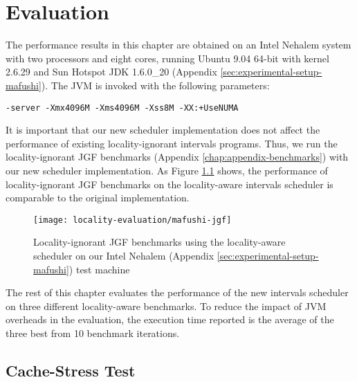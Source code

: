
\chapter{Evaluation}
\label{chap:locality-evaluation}

The performance results in this chapter are obtained on an Intel
Nehalem system with two processors and eight cores, running Ubuntu
9.04 64-bit with kernel 2.6.29 and Sun Hotspot JDK 1.6.0\_20 (Appendix
\ref{sec:experimental-setup-mafushi}). The JVM is invoked with the
following parameters:

\begin{lstlisting}[style=Listing]
  -server -Xmx4096M -Xms4096M -Xss8M -XX:+UseNUMA
\end{lstlisting}

It is important that our new scheduler implementation does not affect
the performance of existing locality-ignorant intervals
programs. Thus, we run the locality-ignorant JGF benchmarks (Appendix
\ref{chap:appendix-benchmarks}) with our new scheduler
implementation. As Figure \ref{fig:locality-evaluation-jgf} shows, the
performance of locality-ignorant JGF benchmarks on the locality-aware
intervals scheduler is comparable to the original implementation.

\begin{figure}[!ht]
  \centering
  \texttt{[image: locality-evaluation/mafushi-jgf]}
  \caption[Locality-ignorant JGF benchmarks running on locality-aware
  scheduler]{Locality-ignorant JGF benchmarks using the locality-aware
    scheduler on our Intel Nehalem (Appendix
    \ref{sec:experimental-setup-mafushi}) test machine}
  \label{fig:locality-evaluation-jgf}
\end{figure}

The rest of this chapter evaluates the performance of the new
intervals scheduler on three different locality-aware benchmarks. To
reduce the impact of JVM overheads in the evaluation, the execution
time reported is the average of the three best from 10 benchmark
iterations.


\section{Cache-Stress Test}

